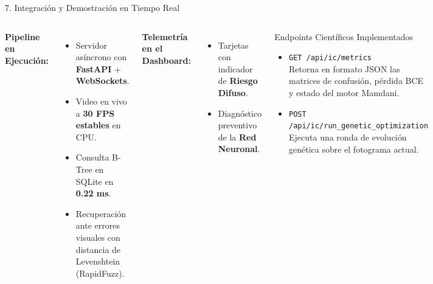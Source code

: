 \documentclass[aspectratio=169, 10pt]{beamer}
\begin{document}
\begin{frame}{7. Integración y Demostración en Tiempo Real}
    \begin{columns}
        \textbf{Pipeline en Ejecución:}
        \begin{itemize}
            \item Servidor asíncrono con \textbf{FastAPI} + \textbf{WebSockets}.
            \item Video en vivo a \textbf{30 FPS estables} en CPU.
            \item Consulta B-Tree en SQLite en \textbf{0.22 ms}.
            \item Recuperación ante errores visuales con distancia de Levenshtein (RapidFuzz).
        \end{itemize}
        \vspace{0.2cm}
        \textbf{Telemetría en el Dashboard:}
        \begin{itemize}
            \item Tarjetas con indicador de \textbf{Riesgo Difuso}.
            \item Diagnóstico preventivo de la \textbf{Red Neuronal}.
        \end{itemize}

        \begin{exampleblock}{Endpoints Científicos Implementados}
            \begin{itemize}
                \item \texttt{GET /api/ic/metrics}\\
                Retorna en formato JSON las matrices de confusión, pérdida BCE y estado del motor Mamdani.
                \item \texttt{POST /api/ic/run\_genetic\_optimization}\\
                Ejecuta una ronda de evolución genética sobre el fotograma actual.
            \end{itemize}
        \end{exampleblock}
    \end{columns}
\end{frame}
\end{document}
